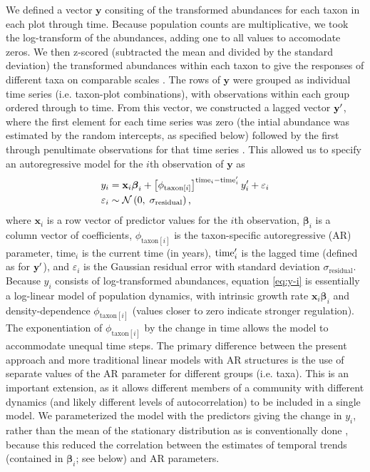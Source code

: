 We defined a vector $\mathbf{y}$ consiting of the transformed abundances for each taxon
in each plot through time.
Because population counts are multiplicative, we took the log-transform of the abundances,
adding one to all values to accomodate zeros.
We then z-scored (subtracted the mean and divided by the standard deviation)
the transformed abundances within each taxon
to give the responses of different taxa on comparable scales \citep{Jackson2012}.
The rows of $\mathbf{y}$ were grouped as individual time series
(i.e. taxon-plot combinations),
with observations within each group ordered through to time.
From this vector,
we constructed a lagged vector $\mathbf{y\sp{\prime}}$,
where the first element for each time series was zero
(the intial abundance was estimated by the random intercepts, as specified below)
followed by the first through
penultimate observations for that time series \citep{Ives2006}.
This allowed us to specify an autoregressive model for the $i$th observation of
$\mathbf{y}$ as
%
\begin{equation} \label{eq:y-i}
\begin{split}
    y_i &= \mathbf{x}_i {\boldsymbol\beta}_i +
        \left[ \phi_{\text{taxon}[i]} \right]^{\text{time}_i - \text{time}\sp{\prime}_i}
        y\sp{\prime}_i + \varepsilon_i \\
    \varepsilon_i &\sim \mathcal{N} \left(0, \; \sigma_{\text{residual}} \right)
    \text{,}
\end{split}
\end{equation}
%
\noindent where $\mathbf{x}_i$ is a row vector of predictor values for the $i$th
observation,
${\boldsymbol\beta}_i$ is a column vector of coefficients,
$\phi_{\text{taxon}[i]}$ is the taxon-specific autoregressive (AR) parameter,
$\text{time}_i$ is the current time (in years),
$\text{time}\sp{\prime}_i$ is the lagged time (defined as for  $\mathbf{y\sp{\prime}}$),
and $\varepsilon_i$  is the Gaussian residual
error with standard deviation $\sigma_{\text{residual}}$.
Because $y_i$ consists of log-transformed abundances, equation \ref{eq:y-i} is
essentially a log-linear model of population dynamics, with intrinsic growth rate
$\mathbf{x}_i{\boldsymbol\beta}_i$ and density-dependence $\phi_{\text{taxon}[i]}$
(values closer to zero indicate stronger regulation).
The exponentiation of $\phi_{\text{taxon}[i]}$ by the change in time allows the model
to accommodate unequal time steps.
The primary difference between the present approach and more traditional linear models
with AR structures \citep[e.g ][]{Zuur2009} is the use of separate values of the AR
parameter for different groups (i.e. taxa).
This is an important extension, as it allows different members of a community with
different dynamics (and likely different levels of autocorrelation) to be included
in a single model.
We parameterized the model with the predictors giving the change in $y_i$,
rather than the mean of the stationary distribution as is conventionally done
\citep{Harvey1990, Ives2006},
because this reduced the correlation between the estimates of temporal trends
(contained in ${\boldsymbol\beta}_i$; see below) and AR parameters.

